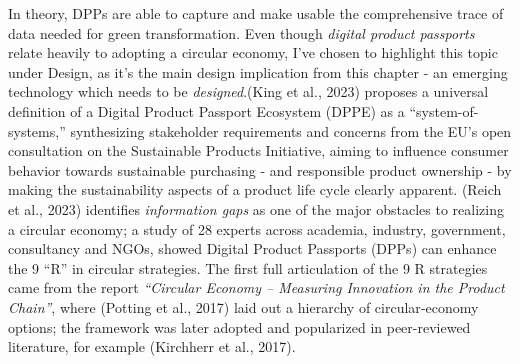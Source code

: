 \documentclass[
  12pt,
  letterpaper,
  DIV=11,
  numbers=noendperiod]{scrartcl}
\begin{document}
In theory, DPPs are able to capture and make usable the comprehensive
trace of data needed for green transformation. Even though \emph{digital
product passports} relate heavily to adopting a circular economy, I've
chosen to highlight this topic under Design, as it's the main design
implication from this chapter - an emerging technology which needs to be
\emph{designed}.(King et al., 2023) proposes a universal definition of a
Digital Product Passport Ecosystem (DPPE) as a ``system-of-systems,''
synthesizing stakeholder requirements and concerns from the EU's open
consultation on the Sustainable Products Initiative, aiming to influence
consumer behavior towards sustainable purchasing - and responsible
product ownership - by making the sustainability aspects of a product
life cycle clearly apparent. (Reich et al., 2023) identifies
\emph{information gaps} as one of the major obstacles to realizing a
circular economy; a study of 28 experts across academia, industry,
government, consultancy and NGOs, showed Digital Product Passports
(DPPs) can enhance the 9 ``R'' in circular strategies. The first full
articulation of the 9 R strategies came from the report \emph{``Circular
Economy -- Measuring Innovation in the Product Chain''}, where (Potting
et al., 2017) laid out a hierarchy of circular‐economy options; the
framework was later adopted and popularized in peer-reviewed literature,
for example (Kirchherr et al., 2017).

\def\pandoctableshortcapt{The R Strategies}
\end{document}
